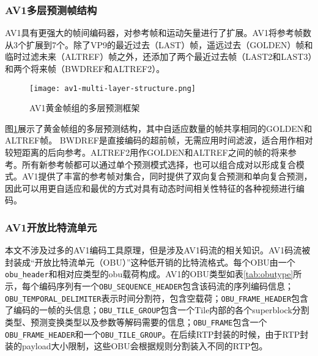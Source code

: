 \subsubsection{AV1多层预测帧结构}

AV1具有更强大的帧间编码器，对参考帧和运动矢量进行了扩展。AV1将参考帧数从3个扩展到7个。除了VP9的最近过去（LAST）帧，遥远过去（GOLDEN）帧和临时过滤未来（ALTREF）帧之外，还添加了两个最近过去帧（LAST2和LAST3）和两个将来帧（BWDREF和ALTREF2）\cite{linEfficientAV1Video2018}。

\begin{figure}[!htp]
	\centering
	\texttt{[image: av1-multi-layer-structure.png]}
	\caption{AV1黄金帧组的多层预测框架\cite{chenOverviewCoreCoding2018}}
	\label{fig:av1-multi-layer-structure}
\end{figure}

图\ref{fig:av1-multi-layer-structure}展示了黄金帧组的多层预测结构，其中自适应数量的帧共享相同的GOLDEN和ALTREF帧。 BWDREF是直接编码的超前帧，无需应用时间滤波，适合用作相对较短距离的后向参考。ALTREF2用作GOLDEN和ALTREF之间的帧的将来参考。所有新参考帧都可以通过单个预测模式选择，也可以组合成对以形成复合模式。AV1提供了丰富的参考帧对集合，同时提供了双向复合预测和单向复合预测，因此可以用更自适应和最优的方式对具有动态时间相关性特征的各种视频进行编码。

\subsubsection{AV1开放比特流单元}
本文不涉及过多的AV1编码工具原理，但是涉及AV1码流的相关知识。AV1码流被封装成“开放比特流单元（OBU）”这种低开销的比特流格式。每个OBU由一个\texttt{obu\_header}和相对应类型的obu载荷构成。AV1的OBU类型如表\ref{tab:obutype}所示，每个编码序列有一个\texttt{OBU\_SEQUENCE\_HEADER}包含该码流的序列编码信息；\texttt{OBU\_TEMPORAL\_DELIMITER}表示时间分割符，包含空载荷；\texttt{OBU\_FRAME\_HEADER}包含了编码的一帧的头信息；\texttt{OBU\_TILE\_GROUP}包含一个Tile内部的各个superblock分割类型、预测变换类型以及参数等解码需要的信息；\texttt{OBU\_FRAME}包含一个\texttt{OBU\_FRAME\_HEADER}和一个\texttt{OBU\_TILE\_GROUP}。在后续RTP封装的时候，由于RTP封装的payload大小限制，这些OBU会根据规则分割装入不同的RTP包。

